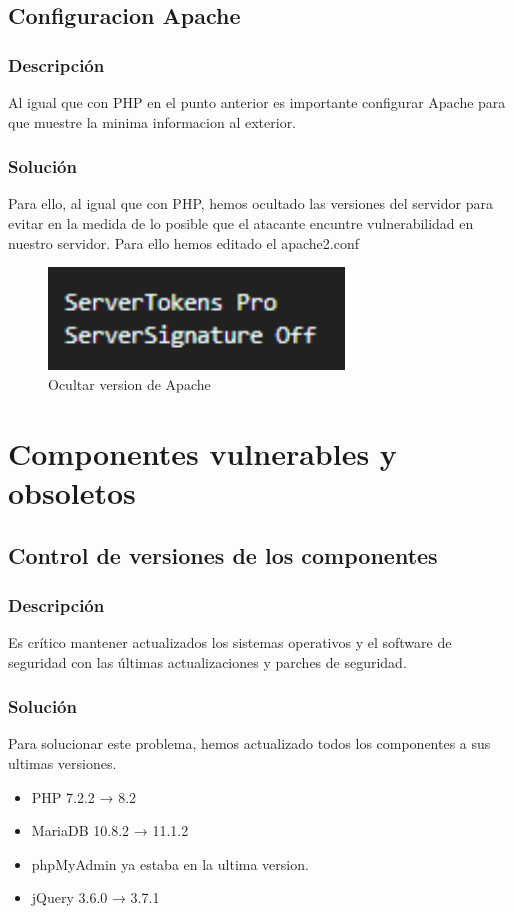 \documentclass{report}
\begin{document}
            \subsection{Configuracion Apache}
                \subsubsection{Descripción}
                    Al igual que con PHP en el punto anterior es importante configurar Apache para que muestre la minima informacion al exterior.
                \subsubsection{Solución}
                    Para ello, al igual que con PHP, hemos ocultado las versiones del servidor para evitar en la medida de lo posible que el atacante encuntre vulnerabilidad en nuestro servidor. Para ello hemos editado el apache2.conf
                    \begin{figure}[H]
                        \centering
                        \includegraphics[width=0.7\textwidth]{./img/vulnerabilidades/3.5.11.1.png}
                        \caption{Ocultar version de Apache}
                    \end{figure}
            \clearpage
        \section{Componentes vulnerables y obsoletos}
            \subsection{Control de versiones de los componentes}
                \subsubsection{Descripción}
                    Es crítico mantener actualizados los sistemas operativos y el software de seguridad con las últimas actualizaciones y parches de seguridad.
                \subsubsection{Solución}
                    Para solucionar este problema, hemos actualizado todos los componentes a sus ultimas versiones.
                    \begin{itemize}
                        \item PHP 7.2.2 → 8.2
                        \item MariaDB 10.8.2 → 11.1.2
                        \item phpMyAdmin ya estaba en la ultima version.
                        \item jQuery 3.6.0 → 3.7.1
                    \end{itemize}
            \clearpage
\end{document}
